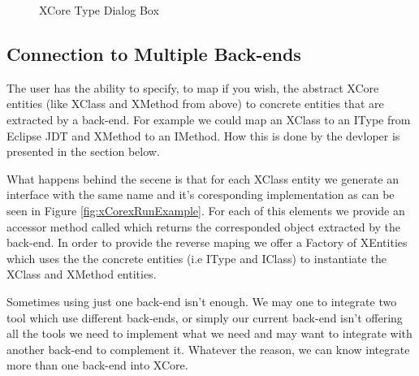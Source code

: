         \begin{figure}[ht]
        \centering
        \caption{XCore Type Dialog Box \cite{oldThesis}}
        \label{fig:xCoreTypeDialogBox}
        \end{figure}


\subsection{Connection to Multiple Back-ends}

        The user has the ability to specify, to map if you wish, the abstract XCore entities (like XClass and XMethod from above) to concrete entities that are extracted by a back-end. For example we
could map an XClass to an IType from Eclipse JDT and XMethod to an IMethod. How this is done by the devloper is presented in the section below.

        What happens behind the secene is that for each XClass entity we generate an interface with the same name and it's coresponding implementation as can be seen in Figure \ref{fig:xCorexRunExample}.
For each of this elements we provide an accessor method called  which returns the corresponded object extracted by the back-end. In order to provide the reverse maping we offer
a Factory of XEntities which uses the the concrete entities (i.e IType and IClass) to instantiate the XClass and XMethod entities.

        Sometimes using just one back-end isn't enough. We may one to integrate two tool which use different back-ends, or simply our current back-end isn't offering all the tools we need to implement 
what we need and may want to integrate with another back-end to complement it. Whatever the reason, we can know integrate more than one back-end into XCore.  

